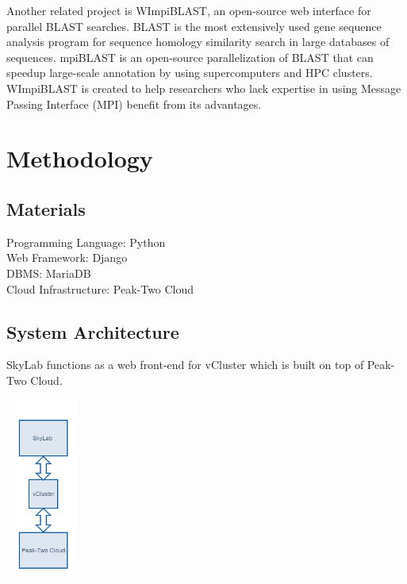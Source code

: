 \documentclass[journal]{./IEEE/IEEEtran}
\begin{document}
		Another related project is WImpiBLAST, an open-source web interface for parallel BLAST searches. BLAST is the most extensively used gene sequence analysis program for sequence homology similarity search in large databases of sequences. mpiBLAST is an open-source parallelization of BLAST that can speedup large-scale annotation by using supercomputers and HPC clusters. WImpiBLAST is created to help researchers who lack expertise in using Message Passing Interface (MPI) benefit from its advantages\cite{9686120720140601}.     
	        
        
\section{Methodology}
   \subsection {Materials}
    \begin{description}
      \item[Programming Language: Python ]
      \item[Web Framework: Django ]
      \item[DBMS: MariaDB]
      \item[Cloud Infrastructure: Peak-Two Cloud ]
    \end{description}


    \subsection{System Architecture}
    SkyLab functions as a web front-end for vCluster which is built on top of Peak-Two Cloud.
   	\begin{center}			
		\includegraphics[width=92px,height=224px]{./images/system_architecture.png}			
	\end{center}	
    
\end{document}

